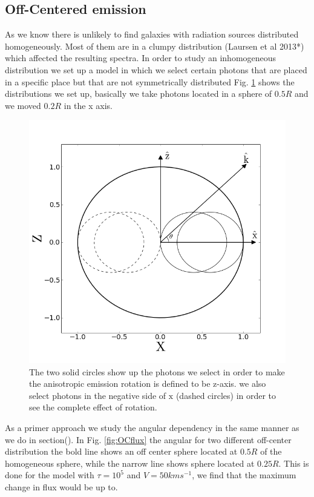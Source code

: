 \documentclass[usenatbib]{mn2e}
\begin{document}
\subsection{Off-Centered emission}

As we know there is unlikely to find galaxies with radiation sources 
distributed homogeneously. Most of them are in a clumpy distribution 
(Laursen et al 2013*) which affected the resulting spectra. In order 
to study an inhomogeneous distribution we set up a model in which we 
select certain photons that are placed in a specific place but that 
are not symmetrically distributed Fig. \ref{fig:OCspheres} shows the distributions we 
set up, basically we take photons located in a sphere of $0.5 R$ and 
we moved $0.2 R$ in the x axis.

\begin{figure}
\includegraphics[scale=0.3]{OF_spheres.png}
\caption{The two solid circles show up the photons we select in order to make the anisotropic emission
		rotation is defined to be $\mathrm{z}$-axis. we also select photons in the negative side of 				        $\mathrm{x}$ (dashed circles) in order to see the complete effect of rotation. 
   \label{fig:OCspheres}} 
\end{figure}

As a primer approach we study the angular dependency in the same manner as
we do in section(). In Fig. \ref{fig:OCflux} the angular for two different
off-center distribution the bold line shows an off center sphere located
at $0.5 R$ of the homogeneous sphere, while the narrow line shows sphere 
located at $0.25 R$. This is done for the model with $\tau=10^{5}$ and 
$V=50 km s^{-1}$, we find that the maximum change in flux would be up to. 
\end{document}
